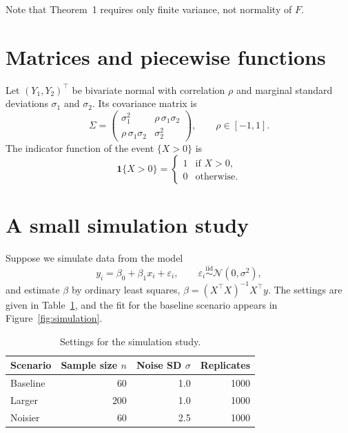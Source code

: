 \documentclass[11pt]{article}
\newcommand{\iid}{\mathrel{\overset{\mathrm{iid}}{\sim}}}
\theoremstyle{definition}
\begin{document}
Note that Theorem~1 requires only finite variance, not normality of $F$.

\section{Matrices and piecewise functions}

Let $(Y_1,Y_2)^\top$ be bivariate normal with correlation $\rho$ and
marginal standard deviations $\sigma_1$ and $\sigma_2$. Its covariance
matrix is
\[
  \Sigma=
  \begin{pmatrix}
    \sigma_1^2 & \rho\,\sigma_1\sigma_2 \\
    \rho\,\sigma_1\sigma_2 & \sigma_2^2
  \end{pmatrix},
  \qquad \rho\in[-1,1].
\]
The indicator function of the event $\{X>0\}$ is
\[
  \mathbf{1}\{X>0\}=
  \begin{cases}
    1 & \text{if }X>0,\\
    0 & \text{otherwise.}
  \end{cases}
\]

\section{A small simulation study}

Suppose we simulate data from the model
\begin{equation}
  y_i=\beta_0+\beta_1x_i+\varepsilon_i,
  \qquad \varepsilon_i\iid\mathcal{N}(0,\sigma^2),
  \label{eq:model}
\end{equation}
and estimate $\beta$ by ordinary least squares,
$\hat\beta=(X^\top X)^{-1}X^\top y$. The settings are given in
Table~\ref{tab:settings}, and the fit for the baseline scenario appears in
Figure~\ref{fig:simulation}.

\begin{table}[htbp]
  \centering
  \caption{Settings for the simulation study.}
  \label{tab:settings}
  \begin{tabular}{lrrr}
    \toprule
    Scenario & Sample size $n$ & Noise SD $\sigma$ & Replicates \\
    \midrule
    Baseline & 60  & 1.0 & 1000 \\
    Larger   & 200 & 1.0 & 1000 \\
    Noisier  & 60  & 2.5 & 1000 \\
    \bottomrule
  \end{tabular}
\end{table}
\end{document}
